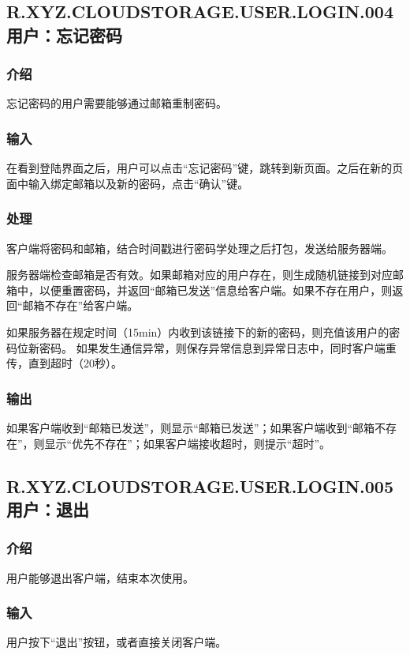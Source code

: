 \subsection{R.XYZ.CLOUDSTORAGE.USER.LOGIN.004 用户：忘记密码 }
\subsubsection{介绍}
忘记密码的用户需要能够通过邮箱重制密码。

\subsubsection{输入}
在看到登陆界面之后，用户可以点击“忘记密码”键，跳转到新页面。之后在新的页面中输入绑定邮箱以及新的密码，点击“确认”键。

\subsubsection{处理}
客户端将密码和邮箱，结合时间戳进行密码学处理之后打包，发送给服务器端。

服务器端检查邮箱是否有效。如果邮箱对应的用户存在，则生成随机链接到对应邮箱中，以便重置密码，并返回“邮箱已发送”信息给客户端。如果不存在用户，则返回“邮箱不存在”给客户端。

如果服务器在规定时间（15min）内收到该链接下的新的密码，则充值该用户的密码位新密码。
如果发生通信异常，则保存异常信息到异常日志中，同时客户端重传，直到超时（20秒）。

\subsubsection{输出}
如果客户端收到“邮箱已发送”，则显示“邮箱已发送”；如果客户端收到“邮箱不存在”，则显示“优先不存在”；如果客户端接收超时，则提示“超时”。

\subsection{R.XYZ.CLOUDSTORAGE.USER.LOGIN.005 用户：退出 }

\subsubsection{介绍}
用户能够退出客户端，结束本次使用。

\subsubsection{输入}
用户按下“退出”按钮，或者直接关闭客户端。

